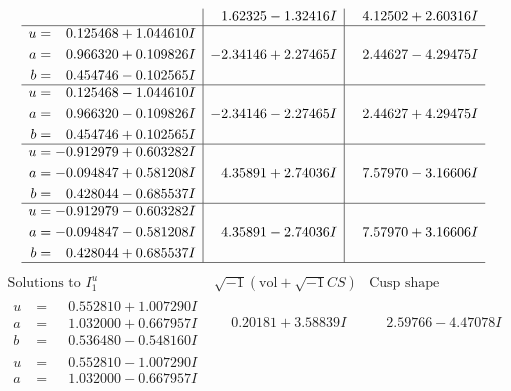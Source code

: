 \documentclass[1p]{elsarticle_modified}
\theoremstyle{definition}
\newcommand{\I}{\sqrt{-1}}
\begin{document}
$$\begin{array}{c|c|c}
 & \phantom{-}1.62325 - 1.32416 I & \phantom{-}4.12502 + 2.60316 I \\ \hline\begin{aligned}
u &= \phantom{-}0.125468 + 1.044610 I \\
a &= \phantom{-}0.966320 + 0.109826 I \\
b &= \phantom{-}0.454746 - 0.102565 I\end{aligned}
 & -2.34146 + 2.27465 I & \phantom{-}2.44627 - 4.29475 I \\ \hline\begin{aligned}
u &= \phantom{-}0.125468 - 1.044610 I \\
a &= \phantom{-}0.966320 - 0.109826 I \\
b &= \phantom{-}0.454746 + 0.102565 I\end{aligned}
 & -2.34146 - 2.27465 I & \phantom{-}2.44627 + 4.29475 I \\ \hline\begin{aligned}
u &= -0.912979 + 0.603282 I \\
a &= -0.094847 + 0.581208 I \\
b &= \phantom{-}0.428044 - 0.685537 I\end{aligned}
 & \phantom{-}4.35891 + 2.74036 I & \phantom{-}7.57970 - 3.16606 I \\ \hline\begin{aligned}
u &= -0.912979 - 0.603282 I \\
a &= -0.094847 - 0.581208 I \\
b &= \phantom{-}0.428044 + 0.685537 I\end{aligned}
 & \phantom{-}4.35891 - 2.74036 I & \phantom{-}7.57970 + 3.16606 I\\
 \hline 
 \end{array}$$\newpage$$\begin{array}{c|c|c}  
\text{Solutions to }I^u_{1}& \I (\text{vol} + \sqrt{-1}CS) & \text{Cusp shape}\\
 \hline 
\begin{aligned}
u &= \phantom{-}0.552810 + 1.007290 I \\
a &= \phantom{-}1.032000 + 0.667957 I \\
b &= \phantom{-}0.536480 - 0.548160 I\end{aligned}
 & \phantom{-}0.20181 + 3.58839 I & \phantom{-}2.59766 - 4.47078 I \\ \hline\begin{aligned}
u &= \phantom{-}0.552810 - 1.007290 I \\
a &= \phantom{-}1.032000 - 0.667957 I \\

\end{aligned}
\end{array}$$
\end{document}
